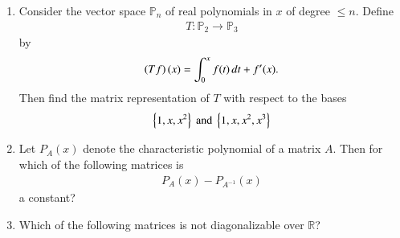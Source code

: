 \renewcommand{\theequation}{\theenumi}
\renewcommand{\thefigure}{\theenumi}
\begin{enumerate}[label=\thesection.\arabic*.,ref=\thesection.\theenumi]


\item Consider the vector space $\mathbb{P}_n$  of real polynomials in $x$ of degree  $\le n$. Define
\begin{align}
T: \mathbb{P}_2 \to \mathbb{P}_3
\end{align}
by
\begin{align}
\left(Tf\right)(x) = \int_{0}^{x}f(t)\,dt + f^{\prime}(x).
\end{align}
%
Then find the matrix representation of $T$ with respect to the bases
\begin{align}
\left\{1,x,x^2\right\} \text{ and } \left\{1,x,x^2,x^3\right\}
\end{align}
%
\item Let $P_A(x)$ denote the characteristic polynomial of a matrix $A$.  Then for which of the following matrices is
\begin{align}
P_A(x)-P_{A^{-1}}(x)
\end{align}
a constant?
\begin{enumerate}
\end{enumerate}
\solution

\item Which of the following matrices is not diagonalizable over $\mathbb{R}$?
\begin{enumerate}
\end{enumerate}
\end{enumerate}

